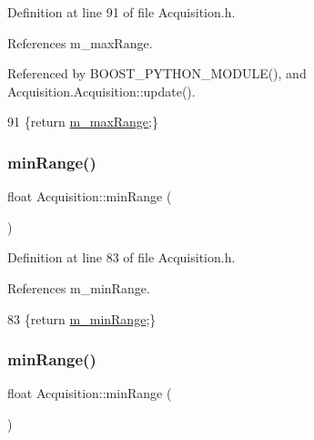 Definition at line 91 of file Acquisition.\+h.



References m\+\_\+max\+Range.



Referenced by B\+O\+O\+S\+T\+\_\+\+P\+Y\+T\+H\+O\+N\+\_\+\+M\+O\+D\+U\+L\+E(), and Acquisition.\+Acquisition\+::update().


\begin{DoxyCode}
91 \{\textcolor{keywordflow}{return} \hyperlink{classAcquisition_a45478629e9db582470b4b158edb46616}{m\_maxRange};\}
\end{DoxyCode}
\mbox{\label{classAcquisition_a44f441710231748d2ca8f691647b2bcd}} 
\subsubsection{\texorpdfstring{min\+Range()}{minRange()}\hspace{0.1cm}{\footnotesize\ttfamily [1/2]}}
{\footnotesize\ttfamily float Acquisition\+::min\+Range (\begin{DoxyParamCaption}{ }\end{DoxyParamCaption})\hspace{0.3cm}{\ttfamily [inline]}}



Definition at line 83 of file Acquisition.\+h.



References m\+\_\+min\+Range.


\begin{DoxyCode}
83 \{\textcolor{keywordflow}{return} \hyperlink{classAcquisition_a06b3ea027ebdcb15f64a6517ceb99b76}{m\_minRange};\}
\end{DoxyCode}
\mbox{\label{classAcquisition_a44f441710231748d2ca8f691647b2bcd}} 
\subsubsection{\texorpdfstring{min\+Range()}{minRange()}\hspace{0.1cm}{\footnotesize\ttfamily [2/2]}}
{\footnotesize\ttfamily float Acquisition\+::min\+Range (\begin{DoxyParamCaption}{ }\end{DoxyParamCaption})\hspace{0.3cm}{\ttfamily [inline]}}



